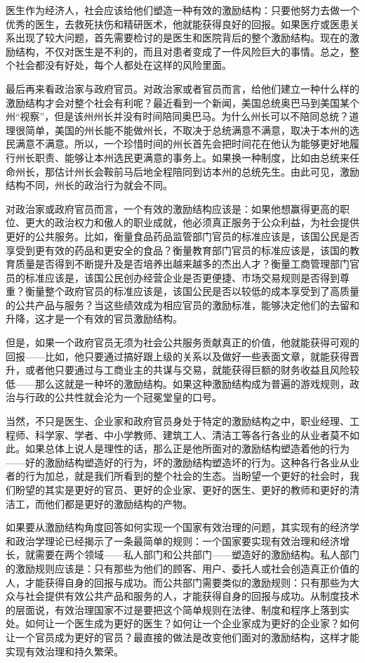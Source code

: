 医生作为经济人，社会应该给他们塑造一种有效的激励结构：只要他努力去做一个优秀的医生，去救死扶伤和精研医术，他就能获得良好的回报。如果医疗或医患关系出现了较大问题，首先需要检讨的是医生和医院背后的整个激励结构。现在的激励结构，不仅对医生是不利的，而且对患者变成了一件风险巨大的事情。总之，整个社会都没有好处，每个人都处在这样的风险里面。

最后再来看政治家与政府官员。对政治家或者官员而言，给他们建立一种什么样的激励结构才会对整个社会有利呢？最近看到一个新闻，美国总统奥巴马到美国某个州“视察”，但是该州州长并没有时间陪同奥巴马。为什么州长可以不陪同总统？道理很简单，美国的州长能不能做州长，不取决于总统满意不满意，取决于本州的选民满意不满意。所以，一个珍惜时间的州长首先会把时间花在他认为能够更好地履行州长职责、能够让本州选民更满意的事务上。如果换一种制度，比如由总统来任命州长，那估计州长会鞍前马后地全程陪同到访本州的总统先生。由此可见，激励结构不同，州长的政治行为就会不同。

对政治家或政府官员而言，一个有效的激励结构应该是：如果他想赢得更高的职位、更大的政治权力和傲人的职业成就，他必须真正服务于公众利益，为社会提供更好的公共服务。比如，衡量食品药品监管部门官员的标准应该是，该国公民是否享受到更有效的药品和更安全的食品？衡量教育部门官员的标准应该是，该国的教育质量是否得到不断提升及是否培养出越来越多的杰出人才？衡量工商管理部门官员的标准应该是，该国公民创办经营企业是否更便捷、市场交易规则是否得到尊重？衡量整个政府官员的标准应该是，该国公民是否以较低的成本享受到了高质量的公共产品与服务？当这些绩效成为相应官员的激励标准，能够决定他们的去留和升降，这才是一个有效的官员激励结构。

但是，如果一个政府官员无须为社会公共服务贡献真正的价值，他就能获得可观的回报——比如，他只要通过搞好跟上级的关系以及做好一些表面文章，就能获得晋升，或者他只要通过与工商业主的共谋与交易，就能获得巨额的财务收益且风险较低——那么这就是一种坏的激励结构。如果这种激励结构成为普遍的游戏规则，政治与行政的公共性就会沦为一个冠冕堂皇的口号。

当然，不只是医生、企业家和政府官员身处于特定的激励结构之中，职业经理、工程师、科学家、学者、中小学教师、建筑工人、清洁工等各行各业的从业者莫不如此。如果总体上说人是理性的话，那么正是他所面对的激励结构塑造着他的行为——好的激励结构塑造好的行为，坏的激励结构塑造坏的行为。这种各行各业从业者的行为加总，就是我们所看到的整个社会的生态。当盼望一个更好的社会时，我们盼望的其实是更好的官员、更好的企业家、更好的医生、更好的教师和更好的清洁工，而他们都是更好的激励结构的产物。

如果要从激励结构角度回答如何实现一个国家有效治理的问题，其实现有的经济学和政治学理论已经揭示了一条最简单的规则：一个国家要实现有效治理和经济增长，就需要在两个领域——私人部门和公共部门——塑造好的激励结构。私人部门的激励规则应该是：只有那些为他们的顾客、用户、委托人或社会创造真正价值的人，才能获得自身的回报与成功。而公共部门需要类似的激励规则：只有那些为大众与社会提供有效公共产品和服务的人，才能获得自身的回报与成功。从制度技术的层面说，有效治理国家不过是要把这个简单规则在法律、制度和程序上落到实处。如何让一个医生成为更好的医生？如何让一个企业家成为更好的企业家？如何让一个官员成为更好的官员？最直接的做法是改变他们面对的激励结构，这样才能实现有效治理和持久繁荣。

